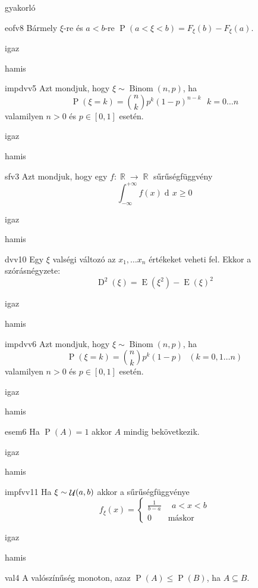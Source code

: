 \documentclass[12pt]{article}
\DeclareMathOperator{\Binom}{Binom}
\DeclareMathOperator{\E}{E}
\DeclareMathOperator{\D}{D}
\renewcommand{\P}{\operatorname{P}}
\renewcommand{\d}{\operatorname{d\! }} %
\DeclareMathOperator{\R}{\mathbb{R}}
\DeclareMathOperator{\Unif}{{\cal U}}
\begin{document}
\begin{quiz}{gyakorló}

\begin{multi}{eofv8}
Bármely $\xi$-re és $a<b$-re $\P(a< \xi <b)=F_{\xi}(b)-F_{\xi}(a)$.
\item igaz
\item* hamis
\end{multi}
\begin{multi}{impdvv5}
Azt mondjuk, hogy $\xi\sim \Binom(n,p)$, ha 
$$
\P(\xi=k)=\binom{n}{k}p^k(1-p)^{n-k}\ \ \ k=0\ldots n
$$
valamilyen $n>0$ és $p\in[0,1]$ esetén.
\item* igaz
\item hamis
\end{multi}
\begin{multi}{sfv3}
Azt mondjuk, hogy egy $f:\R\to \R$ sűrűségfüggvény 
$$
\int_{-\infty}^{+\infty}f(x)\d x\ge 0
$$
\item igaz
\item* hamis
\end{multi}
\begin{multi}{dvv10}
Egy $\xi$ valségi változó az $x_1,\ldots x_n$ értékeket veheti fel. 
Ekkor a szórásnégyzete:
$$
\D^2(\xi)=\E(\xi^2)-\E(\xi)^2
$$
\item* igaz
\item hamis
\end{multi}
\begin{multi}{impdvv6}
Azt mondjuk, hogy $\xi\sim \Binom(n,p)$, ha 
$$
\P(\xi=k)=\binom{n}{k}p^k(1-p)\ \ \ (k=0,1\ldots n)
$$
valamilyen $n>0$ és $p\in[0,1]$ esetén.
\item igaz
\item* hamis
\end{multi}
\begin{multi}{esem6}
Ha $\P(A)=1$ akkor $A$ mindig bekövetkezik.
\item igaz
\item* hamis
\end{multi}
\begin{multi}{impfvv11}
Ha $\xi\sim \Unif(a,b)$ akkor a sűrűségfüggvénye 
$$
f_{\xi}(x)=
\begin{cases}
\frac{1}{b-a} & \ \ a<x<b \\
0 & \text{máskor} 
\end{cases}
$$
\item* igaz
\item hamis
\end{multi}
\begin{multi}{val4}
A valószínűség monoton, azaz $\P(A)\le \P(B)$, ha $A\subseteq B$.

\end{multi}
\end{quiz}
\end{document}
